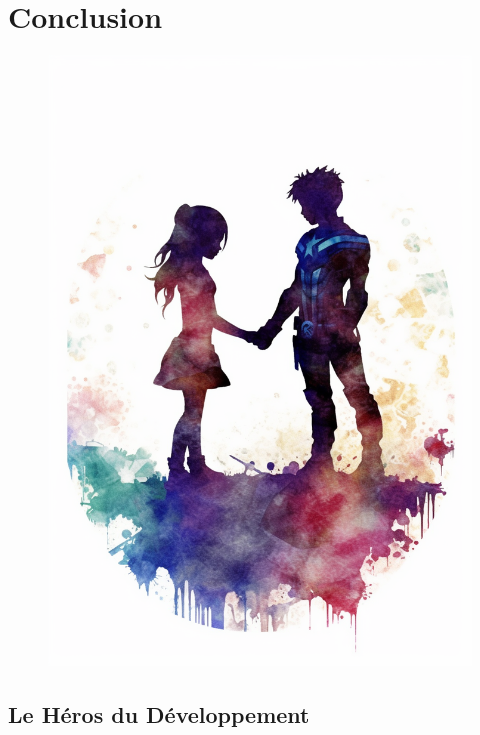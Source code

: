 \part*{Conclusion}
\setcounter{tocdepth}{1}
\setcounter{chapter}{0}

\begin{figure}[H]
    \center
    \includegraphics[keepaspectratio, width=\textwidth, height=\textheight]{images/32f7d1c5-6125-428d-a937-4cf6e528c2c1.png}
\end{figure}

\chapter*{Le Héros du Développement}

